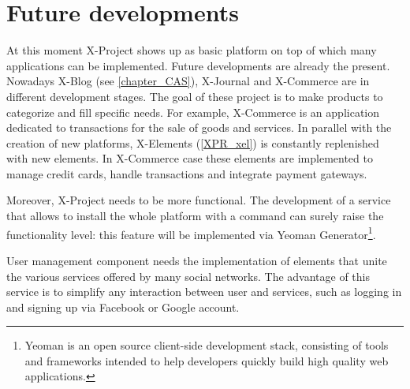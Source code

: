 \section{Future developments}
\label{sec:conclusions_future_developments}

At this moment X-Project shows up as basic platform on top of which many applications can be implemented. Future developments are already the present. Nowadays X-Blog (see \ref{chapter_CAS}), X-Journal and X-Commerce are in different development stages. The goal of these project is to make products to categorize and fill specific needs. For example, X-Commerce is an application dedicated to transactions for the sale of goods and services. In parallel with the creation of new platforms, X-Elements (\ref{XPR_xel}) is constantly replenished with new elements.
In X-Commerce case these elements are implemented to manage credit cards, handle transactions and integrate payment gateways.

Moreover, X-Project needs to be more functional. The development of a service that allows to install the whole platform with a command can surely raise the functionality level: this feature will be implemented via Yeoman Generator\footnote{Yeoman is an open source client-side development stack, consisting of tools and frameworks intended to help developers quickly build high quality web applications.}.

User management component needs the implementation of elements that unite the various services offered by many social networks. The advantage of this service is to simplify any interaction between user and services, such as logging in and signing up via Facebook or Google account.